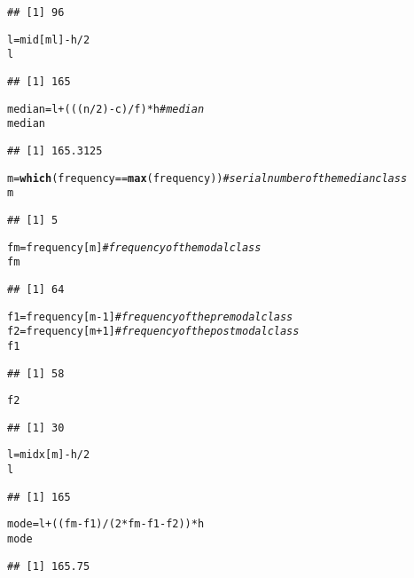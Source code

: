 \documentclass{article}\usepackage[]{graphicx}\usepackage[]{xcolor}
\makeatletter
\newcommand{\hlnum}[1]{\textcolor[rgb]{0.686,0.059,0.569}{#1}}%
\newcommand{\hlcom}[1]{\textcolor[rgb]{0.678,0.584,0.686}{\textit{#1}}}%
\newcommand{\hlopt}[1]{\textcolor[rgb]{0,0,0}{#1}}%
\newcommand{\hldef}[1]{\textcolor[rgb]{0.345,0.345,0.345}{#1}}%
\newcommand{\hlkwb}[1]{\textcolor[rgb]{0.69,0.353,0.396}{#1}}%
\newcommand{\hlkwd}[1]{\textcolor[rgb]{0.737,0.353,0.396}{\textbf{#1}}}%
\newenvironment{kframe}{%
 \def\at@end@of@kframe{}%
 \ifinner\ifhmode%
  \def\at@end@of@kframe{\end{minipage}}%
  \begin{minipage}{\columnwidth}%
 \fi\fi%
 \def\FrameCommand##1{\hskip\@totalleftmargin \hskip-\fboxsep
 \colorbox{shadecolor}{##1}\hskip-\fboxsep
     \hskip-\linewidth \hskip-\@totalleftmargin \hskip\columnwidth}%
 \MakeFramed {\advance\hsize-\width
   \@totalleftmargin\z@ \linewidth\hsize
   \@setminipage}}%
 {\par\unskip\endMakeFramed%
 \at@end@of@kframe}
\newenvironment{knitrout}{}{} %
\makeatother
\begin{document}
\begin{knitrout}
\begin{kframe}
\begin{verbatim}
## [1] 96
\end{verbatim}
\begin{alltt}
\hldef{l}\hlkwb{=}\hldef{mid[ml]}\hlopt{-}\hldef{h}\hlopt{/}\hlnum{2}
\hldef{l}
\end{alltt}
\begin{verbatim}
## [1] 165
\end{verbatim}
\begin{alltt}
\hldef{median}\hlkwb{=}\hldef{l}\hlopt{+}\hldef{(((n}\hlopt{/}\hlnum{2}\hldef{)}\hlopt{-}\hldef{c)}\hlopt{/}\hldef{f)}\hlopt{*}\hldef{h} \hlcom{#median}
\hldef{median}
\end{alltt}
\begin{verbatim}
## [1] 165.3125
\end{verbatim}
\begin{alltt}
\hldef{m}\hlkwb{=}\hlkwd{which}\hldef{(frequency}\hlopt{==}\hlkwd{max}\hldef{(frequency))} \hlcom{#serial number of the median class}
\hldef{m}
\end{alltt}
\begin{verbatim}
## [1] 5
\end{verbatim}
\begin{alltt}
\hldef{fm}\hlkwb{=}\hldef{frequency[m]} \hlcom{# frequency of the modal class}
\hldef{fm}
\end{alltt}
\begin{verbatim}
## [1] 64
\end{verbatim}
\begin{alltt}
\hldef{f1}\hlkwb{=}\hldef{frequency[m}\hlopt{-}\hlnum{1}\hldef{]} \hlcom{# frequency of the pre modal class}
\hldef{f2}\hlkwb{=}\hldef{frequency[m}\hlopt{+}\hlnum{1}\hldef{]} \hlcom{# frequency of the post modal class}
\hldef{f1}
\end{alltt}
\begin{verbatim}
## [1] 58
\end{verbatim}
\begin{alltt}
\hldef{f2}
\end{alltt}
\begin{verbatim}
## [1] 30
\end{verbatim}
\begin{alltt}
\hldef{l}\hlkwb{=}\hldef{midx[m]}\hlopt{-}\hldef{h}\hlopt{/}\hlnum{2}
\hldef{l}
\end{alltt}
\begin{verbatim}
## [1] 165
\end{verbatim}
\begin{alltt}
\hldef{mode}\hlkwb{=}\hldef{l}\hlopt{+}\hldef{((fm}\hlopt{-}\hldef{f1)}\hlopt{/}\hldef{(}\hlnum{2}\hlopt{*}\hldef{fm}\hlopt{-}\hldef{f1}\hlopt{-}\hldef{f2))}\hlopt{*}\hldef{h}
\hldef{mode}
\end{alltt}
\begin{verbatim}
## [1] 165.75
\end{verbatim}
\end{kframe}
\end{knitrout}
\end{document}
